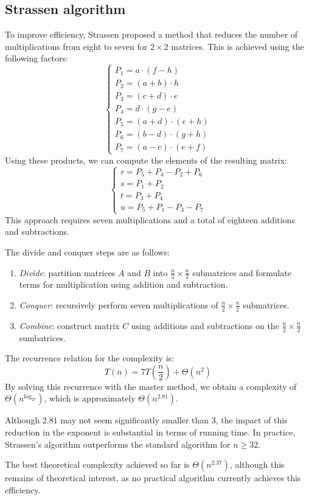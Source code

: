 \subsection{Strassen algorithm}
To improve efficiency, Strassen proposed a method that reduces the number of multiplications from eight to seven for $2 \times 2$ matrices.
This is achieved using the following factors:
\[\begin{cases} P_1=a\cdot(f-h) \\ P_2=(a+b)\cdot h \\ P_3=(c+d)\cdot e \\ P_4=d\cdot(g-e) \\ P_5=(a+d)\cdot(e+h) \\ P_6=(b-d)\cdot(g+h) \\ P_7=(a-c)\cdot(e+f) \end{cases}\]
Using these products, we can compute the elements of the resulting matrix:
\[\begin{cases} r=P_5+P_4-P_2+P_6 \\ s=P_1+P_2 \\ t=P_3+P_4 \\ u=P_5+P_1-P_3-P_7 \end{cases}\]
This approach requires seven multiplications and a total of eighteen additions and subtractions.

The divide and conquer steps are as follows:
\begin{enumerate}
    \item \textit{Divide}: partition matrices $A$ and $B$ into $\frac{n}{2}\times\frac{n}{2}$ submatrices and formulate terms for multiplication using addition and subtraction.
    \item \textit{Conquer}: recursively perform seven multiplications of $\frac{n}{2}\times\frac{n}{2}$ submatrices.
    \item \textit{Combine}: construct matrix $C$ using additions and subtractions on the $\frac{n}{2}\times\frac{n}{2}$ sumbatrices. 
\end{enumerate}
The recurrence relation for the complexity is:
\[T(n)=7T\left(\dfrac{n}{2}\right)+\Theta(n^2)\]
By solving this recurrence with the master method, we obtain a complexity of $\Theta\left(n^{\log_27}\right)$, which is approximately $\Theta\left(n^{2.81}\right)$. 

Although $2.81$ may not seem significantly smaller than $3$, the impact of this reduction in the exponent is substantial in terms of running time.
In practice, Strassen's algorithm outperforms the standard algorithm for $n \geq 32$.

The best theoretical complexity achieved so far is $\Theta\left(n^{2.37}\right)$, although this remains of theoretical interest, as no practical algorithm currently achieves this efficiency.
